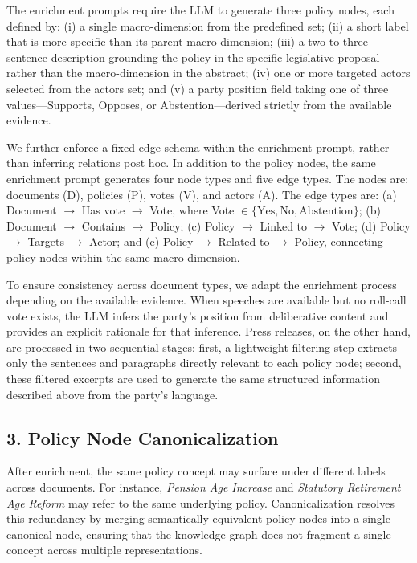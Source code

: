 \documentclass[letterpaper]{article}
\begin{document}
The enrichment prompts require the LLM to generate three policy nodes, each defined by: (i) a single macro-dimension from the predefined set; (ii) a short label that is more specific than its parent macro-dimension; (iii) a two-to-three sentence description grounding the policy in the specific legislative proposal rather than the macro-dimension in the abstract; (iv) one or more targeted actors selected from the actors set; and (v) a party position field taking one of three values---Supports, Opposes, or Abstention---derived strictly from the available evidence.

We further enforce a fixed edge schema within the enrichment prompt, rather than inferring relations post hoc. In addition to the policy nodes, the same enrichment prompt generates four node types and five edge types. The nodes are: documents (D), policies (P), votes (V), and actors (A). The edge types are: (a) Document $\rightarrow$ Has vote $\rightarrow$ Vote, where Vote $\in \{\text{Yes}, \text{No}, \text{Abstention}\}$; (b) Document $\rightarrow$ Contains $\rightarrow$ Policy; (c) Policy $\rightarrow$ Linked to $\rightarrow$ Vote; (d) Policy $\rightarrow$ Targets $\rightarrow$ Actor; and (e) Policy $\rightarrow$ Related to $\rightarrow$ Policy, connecting policy nodes within the same macro-dimension.

To ensure consistency across document types, we adapt the enrichment process depending on the available evidence. When speeches are available but no roll-call vote exists, the LLM infers the party's position from deliberative content and provides an explicit rationale for that inference. Press releases, on the other hand, are processed in two sequential stages: first, a lightweight filtering step extracts only the sentences and paragraphs directly relevant to each policy node; second, these filtered excerpts are used to generate the same structured information described above from the party's language.

\subsection{3. Policy Node Canonicalization}

After enrichment, the same policy concept may surface under different labels across documents. For instance, \emph{Pension Age Increase} and \emph{Statutory Retirement Age Reform} may refer to the same underlying policy. Canonicalization resolves this redundancy by merging semantically equivalent policy nodes into a single canonical node, ensuring that the knowledge graph does not fragment a single concept across multiple representations.
\end{document}
